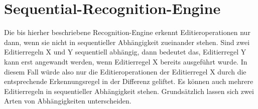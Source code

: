 \chapter{Sequential-Recognition-Engine}
\label{sequential}

Die bis hierher beschriebene Recognition-Engine erkennt Editieroperationen nur dann, wenn sie nicht
in sequentieller Abhängigkeit zueinander stehen. Sind zwei Editierregeln X und Y sequentiell
abhängig, dann bedeutet das, Editierregel Y kann erst angewandt werden, wenn Editierregel X bereits
ausgeführt wurde. In diesem Fall würde also nur die Editieroperationen der Editierregel X durch die
entsprechende Erkennungsregel in der Differenz geliftet. Es können auch mehrere Editierregeln in
sequentieller Abhängigkeit stehen. Grundsätzlich lassen sich zwei Arten von Abhängigkeiten
unterscheiden.


